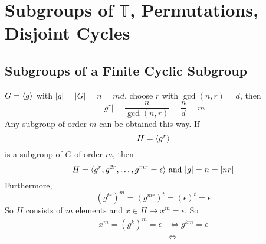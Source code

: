 \documentclass[openany]{report}
\begin{document}
\chapter{Subgroups of $\mathbb{T}$, Permutations, Disjoint Cycles}

\section{Subgroups of a Finite Cyclic Subgroup}
$G = \langle g \rangle$ with $|g| = |G| = n = md$, choose $r$ with $\gcd(n,r) = d$, then
\[|g^r| = \frac{n}{\gcd(n,r)} = \frac{n}{d} = m\]
Any subgroup of order $m$ can be obtained this way. If 
\[H = \langle g^r \rangle\]
is a subgroup of $G$ of order $m$, then
\[H = \langle g^r, g^{2r}, \dots, g^{mr} = \epsilon \rangle\text { and } |g| = n = |nr|\]
Furthermore, 
\[(g^{tr})^m  = (g^{mr})^t = (\epsilon)^t = \epsilon\]
So $H$ consists of $m$ elements and $x \in H \rightarrow x^m = \epsilon$. So
\begin{align*}
    x^m = (g^k)^m = \epsilon &\iff g^{km} =\epsilon\\
    &\iff 
\end{align*}
\end{document}
